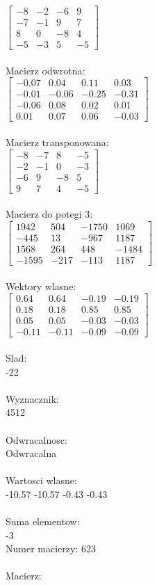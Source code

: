\documentclass[a4paper,12pt]{article}
\begin{document}
$\begin{bmatrix} -8&-2&-6&9\\-7&-1&9&7\\8&0&-8&4\\-5&-3&5&-5 \end{bmatrix}$
\\
\\
Macierz odwrotna:\\

$\begin{bmatrix} -0.07&0.04&0.11&0.03\\-0.01&-0.06&-0.25&-0.31\\-0.06&0.08&0.02&0.01\\0.01&0.07&0.06&-0.03 \end{bmatrix}$
\\
\\
Macierz transponowana:\\

$\begin{bmatrix} -8&-7&8&-5\\-2&-1&0&-3\\-6&9&-8&5\\9&7&4&-5 \end{bmatrix}$
\\
\\
Macierz do potegi 3:\\

$\begin{bmatrix} 1942&504&-1750&1069\\-445&13&-967&1187\\1568&264&448&-1484\\-1595&-217&-113&1187 \end{bmatrix}$
\\
\\
Wektory wlasne:\\

$\begin{bmatrix} 0.64&0.64&-0.19&-0.19\\0.18&0.18&0.85&0.85\\0.05&0.05&-0.03&-0.03\\-0.11&-0.11&-0.09&-0.09 \end{bmatrix}$
\\
\\
Slad:\\
-22
\\
\\
Wyznacznik:\\
4512
\\
\\
Odwracalnosc:\\
Odwracalna
\\
\\
Wartosci wlasne:\\
-10.57 -10.57 -0.43 -0.43
\\
\\
Suma elementow:\\
-3
\\
\newpage
Numer macierzy:
623
\\
\\
Macierz:\\
\end{document}
